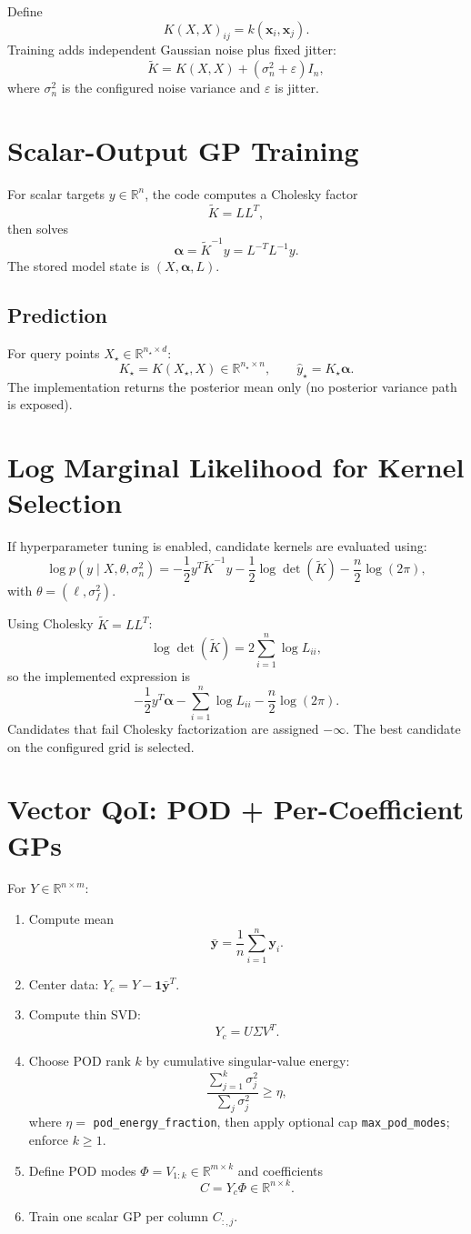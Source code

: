 \documentclass[11pt]{article}
\begin{document}
Define
\[
K(X,X)_{ij}=k(\bm{x}_i,\bm{x}_j).
\]
Training adds independent Gaussian noise plus fixed jitter:
\[
\widetilde{K}=K(X,X)+(\sigma_n^2+\varepsilon)I_n,
\]
where $\sigma_n^2$ is the configured noise variance and $\varepsilon$ is jitter.

\section{Scalar-Output GP Training}
For scalar targets $y\in\mathbb{R}^n$, the code computes a Cholesky factor
\[
\widetilde{K}=LL^T,
\]
then solves
\[
\bm{\alpha}
=\widetilde{K}^{-1}y
=L^{-T}L^{-1}y.
\]
The stored model state is $(X,\bm{\alpha},L)$.

\subsection*{Prediction}
For query points $X_\star\in\mathbb{R}^{n_\star\times d}$:
\[
K_\star = K(X_\star,X)\in\mathbb{R}^{n_\star\times n},\qquad
\hat{y}_\star = K_\star \bm{\alpha}.
\]
The implementation returns the posterior mean only (no posterior variance path is exposed).

\section{Log Marginal Likelihood for Kernel Selection}
If hyperparameter tuning is enabled, candidate kernels are evaluated using:
\[
\log p(y\mid X,\theta,\sigma_n^2)
=
-\frac{1}{2}y^T\widetilde{K}^{-1}y
-\frac{1}{2}\log\det(\widetilde{K})
-\frac{n}{2}\log(2\pi),
\]
with $\theta=(\ell,\sigma_f^2)$.

Using Cholesky $\widetilde{K}=LL^T$:
\[
\log\det(\widetilde{K}) = 2\sum_{i=1}^n \log L_{ii},
\]
so the implemented expression is
\[
-\frac{1}{2}y^T\bm{\alpha} - \sum_{i=1}^n\log L_{ii} -\frac{n}{2}\log(2\pi).
\]
Candidates that fail Cholesky factorization are assigned $-\infty$.
The best candidate on the configured grid is selected.

\section{Vector QoI: POD + Per-Coefficient GPs}
For $Y\in\mathbb{R}^{n\times m}$:
\begin{enumerate}[leftmargin=1.5em]
\item Compute mean
\[
\bar{\bm{y}}=\frac{1}{n}\sum_{i=1}^n \bm{y}_i.
\]
\item Center data: $Y_c=Y-\mathbf{1}\bar{\bm{y}}^T$.
\item Compute thin SVD:
\[
Y_c = U\Sigma V^T.
\]
\item Choose POD rank $k$ by cumulative singular-value energy:
\[
\frac{\sum_{j=1}^k \sigma_j^2}{\sum_{j}\sigma_j^2}
\geq \eta,
\]
where $\eta=$ \texttt{pod\_energy\_fraction}, then apply optional cap
\texttt{max\_pod\_modes}; enforce $k\ge 1$.
\item Define POD modes $\Phi = V_{1:k}\in\mathbb{R}^{m\times k}$ and coefficients
\[
C = Y_c\Phi \in \mathbb{R}^{n\times k}.
\]
\item Train one scalar GP per column $C_{:,j}$.
\end{enumerate}
\end{document}
